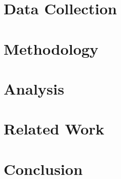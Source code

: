 \documentclass[10pt,twocolumn]{IEEEtran11}
\begin{document}
\section{Data Collection}
\label{sec:datacollection}


\section{Methodology}
\label{sec:methodology}


\section{Analysis}
\label{sec:analysis}


\section{Related Work}  
\label{sec:relatedwork}


\section{Conclusion}
\label{sec:conclusion}




\onecolumn
{}
\label{app:user-attributes}


\begin{comment}
\section{Dataset Profile}

\end{comment}
\end{document}

